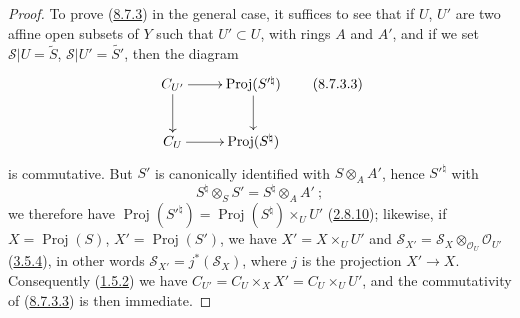\begin{proof}
To prove (\hyperref[II.8.7.3]{8.7.3}) in the general case, it suffices
to see that if $U$, $U'$ are two affine open subsets of $Y$ such that
$U'\subset U$, with rings $A$ and $A'$, and if we set
$\mathcal{S}|U=\widetilde{S}$, $\mathcal{S}|U'=\widetilde{S'}$, then the
diagram
\begin{equation}
\label{II.8.7.3.3}
  \xymatrix{
    C_{U'}\ar[r]\ar[d] & \operatorname{Proj}(S'^{\natural})\ar[d]\\
    C_U\ar[r] & \operatorname{Proj}(S^{\natural})
  }
\tag{8.7.3.3}
\end{equation}
is commutative. But $S'$ is canonically identified with $S\otimes_A A'$, hence
$S'^{\natural}$ with
\[
  S^{\natural}\otimes_S S'=S^{\natural}\otimes_A A'~;
\]
we therefore have
$\operatorname{Proj}(S'^{\natural})=\operatorname{Proj}(S^{\natural})
\times_U U'$ (\hyperref[II.2.8.10]{2.8.10}); likewise, if
$X=\operatorname{Proj}(S)$, $X'=\operatorname{Proj}(S')$, we have
$X'=X\times_U U'$ and
$\mathcal{S}_{X'}=\mathcal{S}_X\otimes_{\mathcal{O}_U}\mathcal{O}_{U'}$
(\hyperref[II.3.5.4]{3.5.4}), in other words
$\mathcal{S}_{X'}=j^*(\mathcal{S}_X)$, where $j$ is the projection $X'\to X$.
Consequently (\hyperref[II.1.5.2]{1.5.2}) we have
$C_{U'}=C_U\times_X X'=C_U\times_U U'$, and the commutativity of
(\hyperref[II.8.7.3.3]{8.7.3.3}) is then immediate.
\end{proof}

